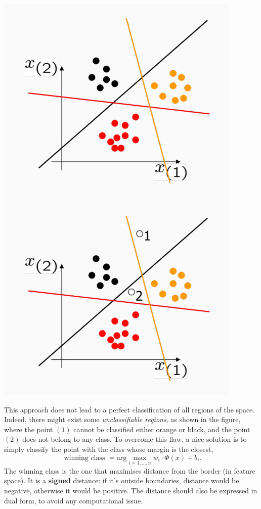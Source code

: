\documentclass[10pt]{report}
\begin{document}
\begin{center}
\includegraphics[scale=0.25]{./pics/svm/svm-ovr-1.jpg}
\end{center}

This approach does not lead to a perfect classification of all regions of the
space. Indeed, there might exist some \emph{unclassifiable regions}, as shown in the
figure, where the point \((1)\) cannot be classified either orange or black, and
the point \((2)\) does not belong to any class. To overcome this flaw, a nice
solution is to simply classify the point with the class whose margin is the
closest,
$$\mbox{ winning class } = \mbox{arg}\max_{i=1,\dots,n} w_i \cdot \Phi(x) +
b_i.$$ The winning class is the one that maximises distance from the border (in
feature space). It is a \textbf{signed} distance: if it's outside boundaries, distance
would be negative, otherwise it would be positive. The distance should also be
expressed in dual form, to avoid any computational issue.
\end{document}
